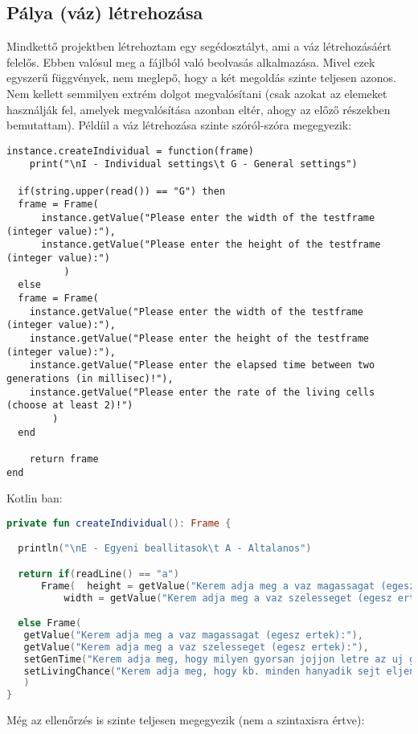 \subsection{Pálya (váz) létrehozása}

Mindkettő projektben létrehoztam egy segédosztályt, ami a váz létrehozásáért felelős. Ebben valósul meg a fájlból való beolvasás alkalmazása. Mivel ezek egyszerű függvények, nem meglepő, hogy a két megoldás szinte teljesen azonos. Nem kellett semmilyen extrém dolgot megvalósítani (csak azokat az elemeket használják fel, amelyek megvalósítása azonban eltér, ahogy az előző részekben bemutattam). Példíil a váz létrehozása szinte szóról-szóra megegyezik:
\scriptsize
\begin{lstlisting}[style=Lua]
instance.createIndividual = function(frame)
	print("\nI - Individual settings\t G - General settings")

  if(string.upper(read()) == "G") then
  frame = Frame(
	  instance.getValue("Please enter the width of the testframe (integer value):"),
	  instance.getValue("Please enter the height of the testframe (integer value):")
          )
  else
  frame = Frame(
	instance.getValue("Please enter the width of the testframe (integer value):"),
	instance.getValue("Please enter the height of the testframe (integer value):"),
	instance.getValue("Please enter the elapsed time between two generations (in millisec)!"), 
	instance.getValue("Please enter the rate of the living cells (choose at least 2)!")
        )
  end

	return frame
end
\end{lstlisting}
Kotlin ban:
\scriptsize
\begin{lstlisting}[language = Kotlin]
private fun createIndividual(): Frame {

  println("\nE - Egyeni beallitasok\t A - Altalanos")

  return if(readLine() == "a")
      Frame(  height = getValue("Kerem adja meg a vaz magassagat (egesz ertek):"),
	      width = getValue("Kerem adja meg a vaz szelesseget (egesz ertek):"))

  else Frame(  
   getValue("Kerem adja meg a vaz magassagat (egesz ertek):"),
   getValue("Kerem adja meg a vaz szelesseget (egesz ertek):"),
   setGenTime("Kerem adja meg, hogy milyen gyorsan jojjon letre az uj generacio (milisec-ben)!"),
   setLivingChance("Kerem adja meg, hogy kb. minden hanyadik sejt eljen (az ertek egesz es legalabb 2 legyen)")
   )
}
\end{lstlisting}
\normalsize
Még az ellenőrzés is szinte teljesen megegyezik (nem a szintaxisra értve):
